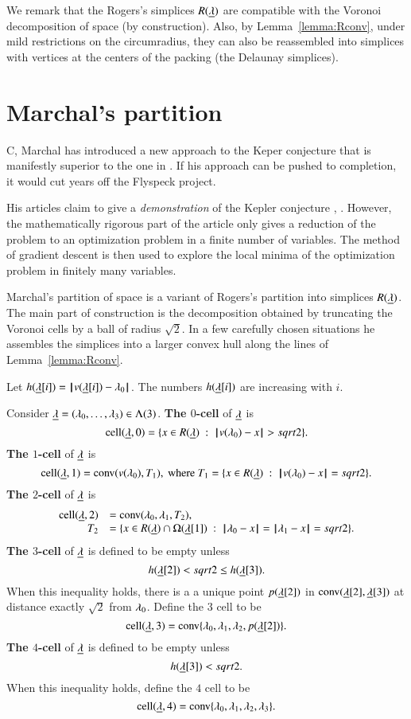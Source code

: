 We remark that the Rogers's simplices $R({\underline{\lambda}})$ are compatible with the Voronoi
decomposition of space (by construction).  Also, by Lemma~\ref{lemma:Rconv}, under
mild restrictions on the circumradius, they can also be reassembled into simplices
with vertices at the centers of the packing (the Delaunay simplices).  

\section{Marchal's partition}

C, Marchal has introduced a new approach to the Keper conjecture that is manifestly superior to the one in \cite{Hales:2006:DCG}.  If his approach can be pushed
to completion, it would cut years off the Flyspeck project.

His articles claim to give
a {\it demonstration} of the Kepler conjecture \cite{marchal:2007}, \cite{marchal:2008}.  However, the
mathematically rigorous part of the article only gives a reduction
of the problem to an optimization problem in a finite number of
variables.  The method of gradient descent is then used to explore
the local minima of the optimization problem in finitely many variables.

Marchal's partition of space is a variant of Rogers's partition into simplices
$R({\underline{\lambda}})$.  The main part of construction is 
the decomposition obtained by truncating the Voronoi cells
by a ball of radius $\sqrt2$.  In a few carefully chosen situations he assembles the simplices
into a larger convex hull along the lines of Lemma~\ref{lemma:Rconv}.

Let $h({\underline{\lambda}}[i]) = {\hskip0.1em|\hskip-0.15em|\hskip0.1em}v({\underline{\lambda}}[i]) - \lambda_0{\hskip0.1em|\hskip-0.15em|\hskip0.1em}$.  The numbers $h({\underline{\lambda}}[i])$ are increasing with $i$.

\begin{definition} Consider ${\underline{\lambda}}=(\lambda_0,\ldots,\lambda_3)\in \Lambda(3)$.
\hfill\break\smallskip  
{\bf The $0$-cell} of ${\underline{\lambda}}$ is
$$
\operatorname{cell}({\underline{\lambda}},0) = \{x\in R({\underline{\lambda}}) \ :\  {\hskip0.1em|\hskip-0.15em|\hskip0.1em}v(\lambda_0) - x{\hskip0.1em|\hskip-0.15em|\hskip0.1em} > sqrt2\}.
$$
\bigskip
{\bf The $1$-cell} of ${\underline{\lambda}}$ is 
$$
\operatorname{cell}({\underline{\lambda}},1) = {\operatorname{conv}}(v(\lambda_0),T_1),\hbox{ where } T_1 = \{x \in R({\underline{\lambda}}) \ :\  {\hskip0.1em|\hskip-0.15em|\hskip0.1em}v(\lambda_0) - x{\hskip0.1em|\hskip-0.15em|\hskip0.1em}= sqrt2\}.
$$
\bigskip
{\bf The $2$-cell} of ${\underline{\lambda}}$ is
$$
\begin{array}{rll}
\operatorname{cell}({\underline{\lambda}},2) &= {\operatorname{conv}}(\lambda_0,\lambda_1,T_2),\quad \\
  T_2 &= \{x \in R({\underline{\lambda}})\cap \Omega({\underline{\lambda}}[1]) \ :\  {\hskip0.1em|\hskip-0.15em|\hskip0.1em}\lambda_0 - x{\hskip0.1em|\hskip-0.15em|\hskip0.1em}={\hskip0.1em|\hskip-0.15em|\hskip0.1em}\lambda_1 - x{\hskip0.1em|\hskip-0.15em|\hskip0.1em} =sqrt2\}.
\end{array}
$$
\bigskip
{\bf The $3$-cell} of ${\underline{\lambda}}$ is defined to be empty unless 
$$
h({\underline{\lambda}}[2]) <sqrt2 \le h({\underline{\lambda}}[3]).
$$
When this inequality holds,
there is a a unique point $p({\underline{\lambda}}[2])$ in
${\operatorname{conv}}({\underline{\lambda}}[2],{\underline{\lambda}}[3])$ at distance exactly $\sqrt2$ from $\lambda_0$.  
Define the $3$ cell to be
$$
\operatorname{cell}({\underline{\lambda}},3) = {\operatorname{conv}}\{\lambda_0,\lambda_1,\lambda_2,p({\underline{\lambda}}[2])\}.
$$
\bigskip
{\bf The $4$-cell} of ${\underline{\lambda}}$ is defined to be empty unless
$$
h({\underline{\lambda}}[3]) <sqrt2.
$$
When this inequality holds, define the $4$ cell to be
$$
\operatorname{cell}({\underline{\lambda}},4) = {\operatorname{conv}}\{\lambda_0,\lambda_1,\lambda_2,\lambda_3\}.
$$
\end{definition}

